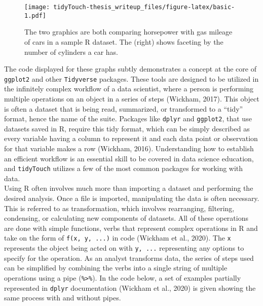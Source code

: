 \documentclass[english,man,floatsintext]{apa6}
\newenvironment{Shaded}{\begin{snugshade}}{\end{snugshade}}
\newcommand{\CommentTok}[1]{\textcolor[rgb]{0.56,0.35,0.01}{\textit{#1}}}
\newcommand{\DataTypeTok}[1]{\textcolor[rgb]{0.13,0.29,0.53}{#1}}
\newcommand{\DecValTok}[1]{\textcolor[rgb]{0.00,0.00,0.81}{#1}}
\newcommand{\KeywordTok}[1]{\textcolor[rgb]{0.13,0.29,0.53}{\textbf{#1}}}
\newcommand{\NormalTok}[1]{#1}
\newcommand{\OperatorTok}[1]{\textcolor[rgb]{0.81,0.36,0.00}{\textbf{#1}}}
\newcommand{\StringTok}[1]{\textcolor[rgb]{0.31,0.60,0.02}{#1}}
\begin{document}
\begin{figure}
\centering
\texttt{[image: tidyTouch-thesis\_writeup\_files/figure-latex/basic-1.pdf]}
\caption{\label{fig:basic}The two graphics are both comparing horsepower with gas mileage of cars in a sample R dataset. The (right) shows faceting by the number of cylinders a car has.}
\end{figure}

The code displayed for these graphs subtly demonstrates a concept at the core of \texttt{ggplot2} and other \texttt{Tidyverse} packages. These tools are designed to be utilized in the infinitely complex workflow of a data scientist, where a person is performing multiple operations on an object in a series of steps (Wickham, 2017). This object is often a dataset that is being read, summarized, or transformed to a \enquote{tidy} format, hence the name of the suite. Packages like \texttt{dplyr} and \texttt{ggplot2}, that use datasets saved in R, require this tidy format, which can be simply described as every variable having a column to represent it and each data point or observation for that variable makes a row (Wickham, 2016). Understanding how to establish an efficient workflow is an essential skill to be covered in data science education, and \texttt{tidyTouch} utilizes a few of the most common packages for working with data.\\
Using R often involves much more than importing a dataset and performing the desired analysis. Once a file is imported, manipulating the data is often necessary. This is referred to as transformation, which involves rearranging, filtering, condensing, or calculating new components of datasets. All of these operations are done with simple functions, verbs that represent complex operations in R and take on the form of \texttt{f(x,\ y,\ ...)} in code (Wickham et al., 2020). The \texttt{x} represents the object being acted on with \texttt{y,\ ...} representing any options to specify for the operation. As an analyst transforms data, the series of steps used can be simplified by combining the verbs into a single string of multiple operations using a pipe (\texttt{\%\textgreater{}\%}). In the code below, a set of examples partially represented in \texttt{dplyr} documentation (Wickham et al., 2020) is given showing the same process with and without pipes.

\begin{Shaded}
\end{Shaded}
\end{document}
